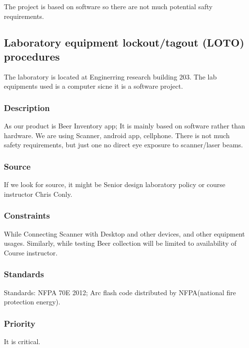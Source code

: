 The project is based on software so there are not much potential safty requirements.
\subsection{Laboratory equipment lockout/tagout (LOTO) procedures}
The laboratory is located at Enginerring research building 203. The lab equipments used is a computer sicne it is a software project.
\subsubsection{Description}
 As our product is Beer Inventory app; It is mainly based on software rather than hardware. We are using Scanner, android app, cellphone. There is not much safety requirements, but just one no direct eye exposure to scanner/laser beams. 
\subsubsection{Source}
If we look for source, it might be Senior design laboratory policy or course instructor Chris Conly. 
\subsubsection{Constraints}
While Connecting Scanner with Desktop and other devices, and other equipment usages. Similarly, while testing Beer collection will be limited to availability of Course instructor.
\subsubsection{Standards}
Standards: NFPA 70E 2012; Arc flash code distributed by NFPA(national fire protection energy).
\subsubsection{Priority}
It is critical.

